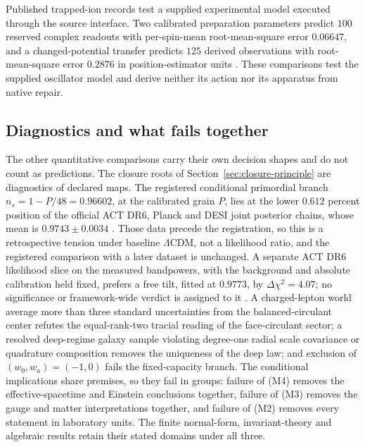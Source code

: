 \documentclass[11pt]{article}
\theoremstyle{definition}
\theoremstyle{remark}
\begin{document}
Published trapped-ion records test a supplied experimental model executed
through the source interface. Two calibrated preparation parameters predict
$100$ reserved complex readouts with per-spin-mean root-mean-square error
$0.06647$, and a changed-potential transfer predicts $125$ derived
observations with root-mean-square error $0.2876$ in position-estimator
units \cite{ophmodel}. These comparisons test the supplied oscillator model
and derive neither its action nor its apparatus from native repair.

\subsection{Diagnostics and what fails together}

The other quantitative comparisons carry their own decision shapes and do not
count as predictions. The closure roots of
Section~\ref{sec:closure-principle} are diagnostics of declared maps. The
registered conditional primordial branch $n_s=1-P/48=0.96602$, at the
calibrated grain $P$, lies at the lower $0.612$ percent position of the
official ACT DR6, Planck and DESI joint posterior chains, whose mean is
$0.9743\pm0.0034$ \cite{act2025,ophpublicdata}. Those data precede the
registration, so this is a retrospective tension under baseline
$\Lambda$CDM, not a likelihood ratio, and the registered comparison with a
later dataset is unchanged. A separate ACT DR6 likelihood slice on the
measured bandpowers, with the background and absolute calibration held fixed,
prefers a free tilt, fitted at $0.9773$, by $\Delta\chi^2=4.07$; no
significance or framework-wide verdict is assigned to it \cite{ophpublicdata}. A
charged-lepton world average more than three standard uncertainties from the
balanced-circulant center refutes the equal-rank-two tracial reading of the
face-circulant sector; a resolved deep-regime galaxy sample violating
degree-one radial scale covariance or quadrature composition removes the
uniqueness of the deep law; and exclusion of $(w_0,w_a)=(-1,0)$ fails the
fixed-capacity branch. The conditional implications share premises, so they
fail in groups: failure of (M4) removes the effective-spacetime and Einstein
conclusions together, failure of (M3) removes the gauge and matter
interpretations together, and failure of (M2) removes every statement in
laboratory units. The finite normal-form, invariant-theory and algebraic
results retain their stated domains under all three.

\end{document}

